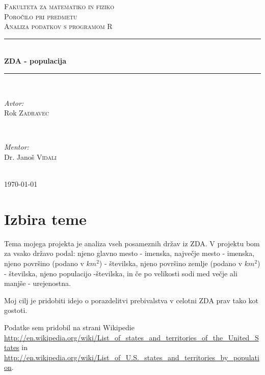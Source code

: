 \documentclass[11pt,a4paper]{article}
\begin{document}
\begin{titlepage}
\newcommand{\HRule}{\rule{\linewidth}{0.5mm}}
\center

\textsc{\LARGE Fakulteta za matematiko in fiziko}\\[3 cm]
\textsc{\Large Poročilo pri predmetu}\\[0.5cm]
\textsc{\large Analiza podatkov s programom R}\\[2 cm]
\HRule \\[0.4cm]
{ \huge \bfseries ZDA - populacija}\\[0.4cm] 
\HRule \\[6 cm]


\begin{minipage}{0.4\textwidth}
\begin{flushleft} \large
\emph{Avtor:}\\
Rok \textsc{Zadravec}
\end{flushleft}
\end{minipage}
~
\begin{minipage}{0.4\textwidth}
\begin{flushright} \large
\emph{Mentor:} \\
Dr. Janoš \textsc{Vidali}
\end{flushright}
\end{minipage}\\[2 cm]

{\large \today}\\[3cm] 


\end{titlepage}

\section{Izbira teme}

Tema mojega projekta je analiza vseh posameznih držav iz ZDA. V projektu bom za vsako državo podal: njeno glavno mesto - imenska, največje mesto - imenska, njeno površino (podano v $km^2$) - številska, njeno površino zemlje (podano v $km^2$) - številska, njeno populacijo -številska, in če po velikosti sodi med večje ali manjše - urejenostna.

Moj cilj je pridobiti idejo o porazdelitvi prebivalstva v celotni ZDA prav tako kot gostoti.

Podatke sem pridobil na strani Wikipedie \url{http://en.wikipedia.org/wiki/List_of_states_and_territories_of_the_United_States} in \url{http://en.wikipedia.org/wiki/List_of_U.S._states_and_territories_by_population}.
\end{document}
